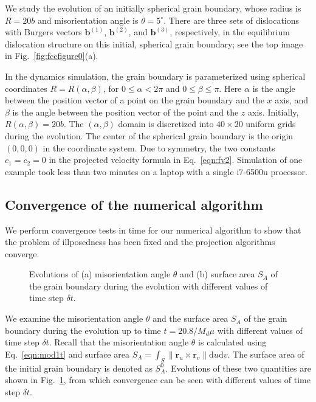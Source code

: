 We study the evolution of an initially spherical grain boundary, whose radius is $R=20b$ and misorientation angle is $\theta = 5^\circ $.
There are three sets of dislocations with Burgers vectors $\mathbf b^{(1)}$, $\mathbf{b}^{(2)}$, and $\mathbf{b}^{(3)}$, respectively, in the equilibrium dislocation structure on this initial, spherical grain boundary; see the top image in Fig.~\ref{fig:fccfigure0}(a).



In the dynamics simulation, the grain boundary is parameterized using spherical coordinates $R=R(\alpha,\beta)$, for $0\leq \alpha < 2\pi$ and $0\leq \beta\leq \pi$. Here $\alpha$ is the angle between the position vector of a point on the grain boundary and the $x$ axis, and $\beta$ is the angle between the position vector of the point  and the $z$ axis.
Initially, $R(\alpha,\beta)=20b$. The $(\alpha,\beta)$ domain is discretized into $40\times20$ uniform grids during the evolution. The center of the spherical grain boundary is the origin $(0,0,0)$ in the coordinate system. Due to symmetry, the two constants $c_1=c_2=0$ in the projected velocity formula in Eq.~\eqref{eqn:fv2}.  Simulation of one example  took less than two minutes on a laptop with a single i7-6500u processor.

\subsection{Convergence of the numerical algorithm}

We perform convergence tests in time for our numerical algorithm to show that the problem of illposedness has been fixed and the projection algorithms converge.





\begin{figure}[htbp]
	\centering
	\caption{ Evolutions of (a) misorientation angle $\theta$  and (b) surface area  $S_A$ of the grain boundary during the evolution with different values of time step $\delta t$.
 }\label{fig:convergencedt}
\end{figure}

We examine the misorientation angle $\theta$  and the surface area  $S_A$ of the grain boundary during the evolution up to time $t=20.8 /M_d\mu$ with different values of time step $\delta t$.
Recall that the misorientation angle $\theta$ is calculated using Eq.~\eqref{eqn:mod1t} and surface area $S_A=\int_S\|\mathbf r_u\times\mathbf r_v\|\mathrm{d}u\mathrm{d}v$. The surface area of the initial grain boundary is denoted as $S_A^0$.  Evolutions of these two quantities are shown in Fig.~\ref{fig:convergencedt}, from which convergence can be seen with  different values of time step $\delta t$.




